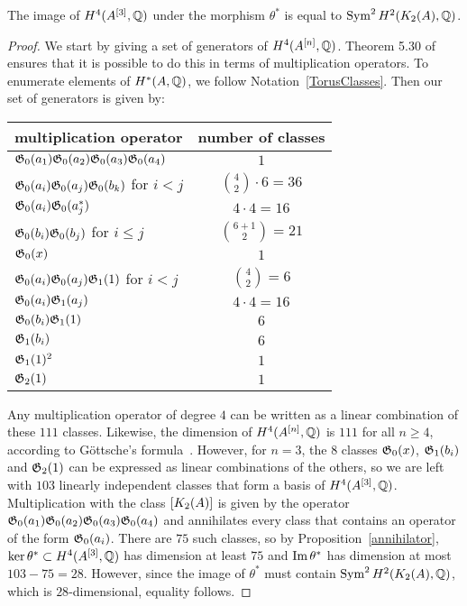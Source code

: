 \begin{proposition}\label{ImSym}
The image of $H^4(A^{[3]},\mathbb{Q})$ under the morphism $\theta^*$ is equal to $\operatorname{Sym}^2H^2(K_{ 2 }( A ),\mathbb{Q})$.
\end{proposition}
\begin{proof}
We start by giving a set of generators of $H^4(A^{[n]},\mathbb{Q})$. Theorem 5.30 of~\cite{LiQinWang} ensures that it is possible to do this in terms of multiplication operators. To enumerate elements of $H^*(A,\mathbb{Q})$, we follow Notation~\ref{TorusClasses}. Then our set of generators is given by:
\begin{center}
\begin{tabular}{l|c}
multiplication operator & number of classes \\ \hline
$\mathfrak{G}_0(a_1)\mathfrak{G}_0(a_2)\mathfrak{G}_0(a_3)\mathfrak{G}_0(a_4) $  & $1$ \\
$\mathfrak{G}_0(a_i)\mathfrak{G}_0(a_j)\mathfrak{G}_0(b_k)$ for $i<j$  & $\binom{4}{2}\cdot 6 = 36$ \\
$\mathfrak{G}_0(a_i)\mathfrak{G}_0(a_j^*)$ & $4\cdot 4 = 16$ \\
$\mathfrak{G}_0(b_i)\mathfrak{G}_0(b_j)$ for $i\leq j$& $\binom{6+1}{2}= 21$ \\
$\mathfrak{G}_0(x)$ &  $1$  \\ \hline
$\mathfrak{G}_0(a_i)\mathfrak{G}_0(a_j)\mathfrak{G}_1(1)$ for $i<j$ & $\binom{4}{2} = 6$ \\
$\mathfrak{G}_0(a_i)\mathfrak{G}_1(a_j)$ & $4\cdot 4=16$ \\
$\mathfrak{G}_0(b_i)\mathfrak{G}_1(1)$ & $6$ \\
$\mathfrak{G}_1(b_i)$ & $6$ \\
$\mathfrak{G}_1(1)^2 $ & $1$ \\ \hline
$\mathfrak{G}_2(1) $ &$1$
\end{tabular}
\end{center}
Any multiplication operator of degree $4$ can be written as a linear combination of these $111$ classes. Likewise, the dimension of $H^4(A^{[n]},\mathbb{Q})$ is $111$ for all $n\geq 4$, according to G\"ottsche's formula~\cite{Gottsche}. However, for $n=3$, the $8$ classes $\mathfrak{G}_0(x)$, $\mathfrak{G}_1(b_i)$ and $\mathfrak{G}_2(1) $ can be expressed as linear combinations of the others, so we are left with $103$ linearly independent classes that form a basis of $H^4(A^{[3]},\mathbb{Q})$. Multiplication with the class $[K_{ 2 }( A )]$ is given by the operator $\mathfrak{G}_0(a_1)\mathfrak{G}_0(a_2)\mathfrak{G}_0(a_3)\mathfrak{G}_0(a_4) $ and annihilates every class that contains an operator of the form $\mathfrak{G}_0(a_i)$. There are $75$ such classes, so by Proposition~\ref{annihilator}, $\ker \theta^*\subset H^4(A^{[3]},\mathbb{Q})$ has dimension at least $75$ and $\operatorname{Im}\theta^*$ has dimension at most $103-75=28$. However, since the image of $\theta^*$ must contain $\operatorname{Sym}^2H^2(K_{ 2 }( A ),\mathbb{Q})$, which is $28$-dimensional, equality follows.
\end{proof}


